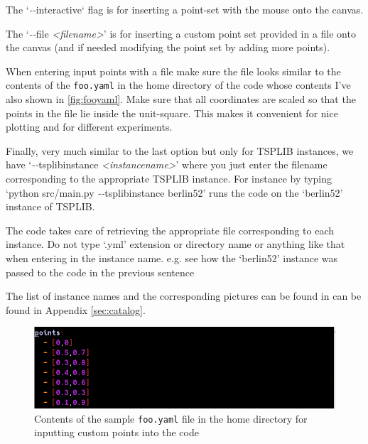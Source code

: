 \begin{appendices}
The `\textit{-}\textit{-}interactive` flag is for inserting a 
point-set with the mouse onto the canvas. 

The `\textit{-}\textit{-}file \textit{<filename>}' is for inserting a 
custom point set provided in a file onto the canvas  (and if needed 
modifying the point set by adding more points). 

When entering input points with a file make sure the file looks similar 
to the contents of the \verb|foo.yaml| in the home directory of the code 
whose contents I've also shown in \autoref{fig:fooyaml}. Make sure that 
all coordinates are scaled so that the points in the file lie inside the unit-square. This makes it convenient 
for nice plotting and for different experiments. 

Finally, very much similar to the last option but only for TSPLIB instances, we have
`\textit{-}\textit{-}tsplibinstance \textit{<instancename>}' where you just enter the filename
corresponding to the appropriate TSPLIB instance. For instance by typing
`python src/main.py \textit{-}\textit{-}tsplibinstance berlin52' runs the code 
on the `berlin52' instance of TSPLIB. 

\begin{mdframed}
{\color{alizarin} 
The code takes care of retrieving the appropriate file corresponding to each instance. Do not 
type `.yml' extension or directory name or anything like that when entering in the instance name. e.g. see how the `berlin52'
instance was passed to the code in the previous sentence}
\end{mdframed}

The list of instance names and the corresponding pictures can be found in can be found in Appendix \autoref{sec:catalog}. 

\begin{figure}[H]
  \centering
  \includegraphics[width=12cm]{miscimages/fooyaml-screenshot.png}
  \caption{\label{fig:fooyaml} Contents of the sample \texttt{foo.yaml} file in the home directory for inputting custom points into the code}
\end{figure}





\end{appendices}
